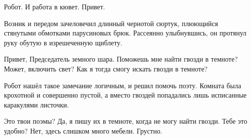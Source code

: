 {\small \begin{dialog}
\X Робот. И работа в кювет. Привет.
\end{dialog}

\begin{monolog}
Возник и передом зачеловечил длинный чернотой сюртук, плюющийся стянутыми обмотками парусиновых брюк. Рассеянно улыбнувшись, он протянул руку обутую в изрешеченную щиблету.
\end{monolog}

\begin{dialog}
\R Привет, Председатель земного шара.
\X Поможешь мне найти гвозди в темноте?
\R Может, включить свет?
\X Как я тогда смогу искать гвозди в темноте?
\end{dialog}

\begin{monolog}
Робот нашёл такое замечание логичным, и решил помочь поэту. Комната была крохотной и совершенно пустой, а вместо гвоздей попадались лишь исписанные каракулями листочки.
\end{monolog}

\begin{dialog}
\R Это твои поэмы?
\X Да, я пишу их в темноте, когда не могу найти гвозди.
\R Тебе это удобно?
\X Нет, здесь слишком много мебели.
\R Грустно.
\end{dialog}
}